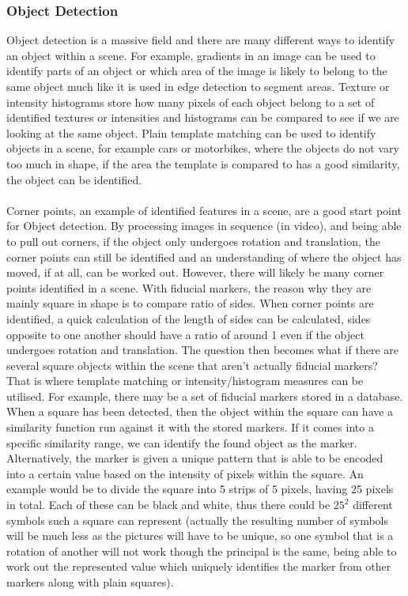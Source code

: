\documentclass[11pt]{article}
\begin{document}
\subsubsection{Object Detection}
Object detection is a massive field and there are many 
different ways to identify an object within a scene. For 
example, gradients in an image can be used to identify 
parts of an object or which area of the image is likely 
to belong to the same object much like it is used in edge
detection to segment areas. Texture or intensity histograms 
store how many pixels of each object belong to a set of 
identified textures or intensities and histograms can 
be compared to see if we are looking at the same object. 
Plain template matching can be used to identify objects 
in a scene, for example cars or motorbikes, where the objects 
do not vary too much in shape, if the area the template 
is compared to has a good similarity, the object can be 
identified. \\
\\
Corner points, an example of identified features in a scene,
are a good start point for Object detection. By processing
images in sequence (in video), and being able to pull out
corners, if the object only undergoes rotation and translation,
the corner points can still be identified and an understanding
of where the object has moved, if at all, can be worked out.
However, there will likely be many corner points identified
in a scene. With fiducial markers, the reason why they are
mainly square in shape is to compare ratio of sides. When
corner points are identified, a quick calculation of the
length of sides can be calculated, sides opposite to
one another should have a ratio of around 1 even if 
the object undergoes rotation and translation. The question
then becomes what if there are several square objects within
the scene that aren't actually fiducial markers? That is
where template matching or intensity/histogram measures 
can be utilised. For example, there may be a set of fiducial
markers stored in a database. When a square has been detected,
then the object within the square can have a similarity
function run against it with the stored markers. If it 
comes into a specific similarity range, we can identify the
found object as the marker. Alternatively, the marker
is given a unique pattern that is able to be encoded into
a certain value based on the intensity of pixels within the
square. An example would be to divide the square into 5 
strips of 5 pixels, having 25 pixels in total. Each of
these can be black and white, thus there could be
$25^2$ different symbols such a square can represent 
(actually the resulting number of symbols will be much less
as the pictures will have to be unique, so one symbol
that is a rotation of another will not work though the 
principal is the same, being able to work out the 
represented value which uniquely identifies the marker
from other markers along with plain squares).\\
\\
\end{document}
